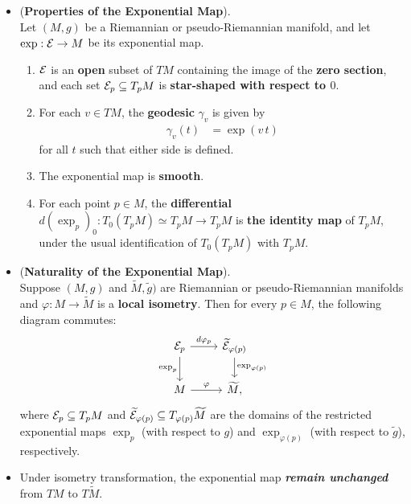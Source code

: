 \documentclass[11pt]{article}
\begin{document}
\begin{itemize}
\item \begin{proposition}(\textbf{Properties of the Exponential Map}). \citep{lee2018introduction}\\
Let $(M, g)$ be a Riemannian or pseudo-Riemannian manifold, and let $\exp: {\mathcal E} \rightarrow M$ be its exponential map.
\begin{enumerate}
\item  ${\mathcal E}$ is an \textbf{open} subset of $TM$ containing the image of the \textbf{zero section}, and each
set ${\mathcal E}_p \subseteq T_{p}M$ is \textbf{star-shaped with respect to $0$}.
\item For each $v \in TM$, the \textbf{geodesic} $\gamma_v$ is given by
\begin{align}
\gamma_{v}(t) &= \exp(v\,t) \label{eqn: exp_map_geodesic}
\end{align} for all $t$ such that either side is defined.
\item The exponential map is \textbf{smooth}.
\item For each point $p \in M$, the \textbf{differential} $d(\exp_p)_0: T_0(T_{p}M) \simeq T_{p}M \rightarrow T_{p}M$ is \textbf{the identity map} of $T_{p}M$, under the usual identification of $T_{0}(T_{p}M)$ with $T_{p}M$.
\end{enumerate}
\end{proposition}

\item \begin{proposition} (\textbf{Naturality of the Exponential Map}). \\
Suppose $(M, g)$ and $\widetilde{M},\widetilde{g})$ are Riemannian or pseudo-Riemannian manifolds and $\varphi: M \rightarrow \widetilde{M}$ is a \textbf{local isometry}. Then for every $p \in M$, the following diagram commutes:
\[
  \begin{tikzcd}
    \cE_{p} \arrow{r}{d\varphi_p} \arrow[swap]{d}{\exp_p} & \widetilde{\cE}_{\varphi(p)} \arrow{d}{\exp_{\varphi(p)}} \\
    M \arrow{r}{\varphi} & \widetilde{M},
  \end{tikzcd}
\] where ${\mathcal E}_p \subseteq T_{p}M$ and $ \widetilde{{\mathcal E}}_{\varphi(p)} \subseteq T_{\varphi(p)}\widetilde{M}$ are the domains of the restricted exponential maps $\exp_p$ (with respect to $g$) and $\exp_{\varphi(p)}$ (with respect to $\tilde{g}$), respectively.
\end{proposition}

\item \begin{remark}
Under isometry transformation, the exponential map \emph{\textbf{remain unchanged}} from $TM$ to $T\widetilde{M}$.
\end{remark}


\end{itemize}
\end{document}
